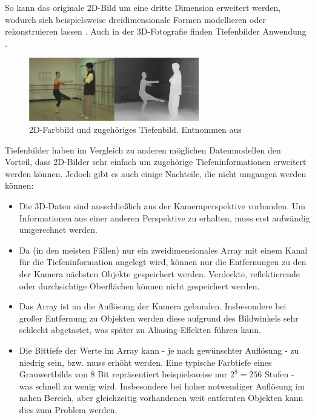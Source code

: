 So kann das originale 2D-Bild um eine dritte Dimension erweitert werden, wodurch sich beispielsweise dreidimensionale Formen modellieren oder rekonstruieren lassen \cite{arsalan2017synthesizing}.
Auch in der 3D-Fotografie finden Tiefenbilder Anwendung \cite{redert2006philips}.

\begin{figure}[ht]
	\centering
	\includegraphics[width=0.66\textwidth]{images/depth_map.png}
	\caption{2D-Farbbild und zugehöriges Tiefenbild. Entnommen aus \cite[649]{muller2010depth}}
	\label{fig:depth_map}
\end{figure}

Tiefenbilder haben im Vergleich zu anderen möglichen Datenmodellen den Vorteil, dass 2D-Bilder sehr einfach um zugehörige Tiefeninformationen erweitert werden können.
Jedoch gibt es auch einige Nachteile, die nicht umgangen werden können:

\begin{itemize}
\item Die 3D-Daten sind ausschließlich aus der Kameraperspektive vorhanden.
Um Informationen aus einer anderen Perspektive zu erhalten, muss erst aufwändig umgerechnet werden.
\item Da (in den meisten Fällen) nur ein zweidimensionales Array mit einem Kanal für die Tiefeninformation angelegt wird, können nur die Entfernungen zu den der Kamera nächsten Objekte gespeichert werden.
Verdeckte, reflektierende oder durchsichtige Oberflächen können nicht gespeichert werden.
\item Das Array ist an die Auflösung der Kamera gebunden.
Insbesondere bei großer Entfernung zu Objekten werden diese aufgrund des Bildwinkels sehr schlecht abgetastet, was später zu Aliasing-Effekten führen kann.
\item Die Bittiefe der Werte im Array kann - je nach gewünschter Auflösung - zu niedrig sein, bzw. muss erhöht werden.
Eine typische Farbtiefe eines Grauwertbilds von 8 Bit repräsentiert beispielsweise nur $2^8 = 256$ Stufen - was schnell zu wenig wird.
Insbesondere bei hoher notwendiger Auflösung im nahen Bereich, aber gleichzeitig vorhandenen weit entfernten Objekten kann dies zum Problem werden.
\end{itemize}


